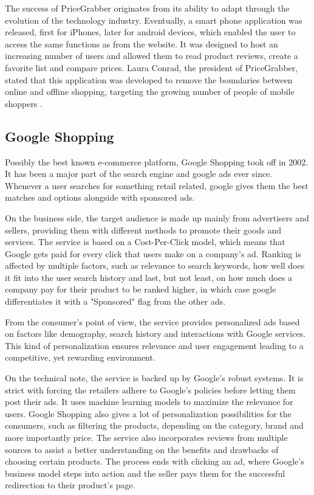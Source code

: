 The success of PriceGrabber originates from its ability to adapt through the evolution of the technology industry. Eventually, a smart phone application was released, first for iPhones, later for android devices, which enabled the user to access the same functions as from the website. It was designed to host an increasing number of users and allowed them to read product reviews, create a favorite list and compare prices. Laura Conrad, the president of PriceGrabber, stated that this application was developed to remove the boundaries between online and offline shopping, targeting the growing number of people of mobile shoppers \cite{HarnickPriceGrabberApp}.

\subsection{Google Shopping}

Possibly the best known e-commerce platform, Google Shopping took off in 2002. It has been a major part of the search engine and google ads ever since. Whenever a user searches for something retail related, google gives them the best matches and options alongside with sponsored ads.

On the business side, the target audience is made up mainly from advertisers and sellers, providing them with different methods to promote their goods and services. The service is based on a Cost-Per-Click model, which means that Google gets paid for every click that users make on a company's ad. Ranking is affected by multiple factors, such as relevance to search keywords, how well does it fit into the user search history and last, but not least, on how much does a company pay for their product to be ranked higher, in which case google differentiates it with a "Sponsored" flag from the other ads.

From the consumer's point of view, the service provides personalized ads based on factors like demography, search history and interactions with Google services. This kind of personalization ensures relevance and user engagement leading to a competitive, yet rewarding environment.

On the technical note, the service is backed up by Google's robust systems. It is strict with forcing the retailers adhere to Google's policies before letting them post their ads. It uses machine learning models to maximize the relevance for users. Google Shopping also gives a lot of personalization possibilities for the consumers, such as filtering the products, depending on the category, brand and more importantly price. The service also incorporates reviews from multiple sources to assist a better understanding on the benefits and drawbacks of choosing certain products. The process ends with clicking an ad, where Google's business model steps into action and the seller pays them for the successful redirection to their product's page. \cite{Google2023}

